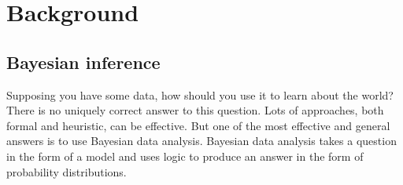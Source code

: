 \documentclass[british]{scrreprt}
\begin{document}
\chapter{Background}
\label{ch:background}

\section{Bayesian inference}
\label{sec:bayesian-inference}
\begin{displayquote}
    Supposing you have some data, how should you use it to learn about the world? There is no uniquely correct answer to this question. Lots of approaches, both formal and heuristic, can be effective. But one of the most effective and general answers is to use Bayesian data analysis. Bayesian data analysis takes a question in the form of a model and uses logic to produce an answer in the form of probability distributions.
\end{displayquote}
\end{document}
